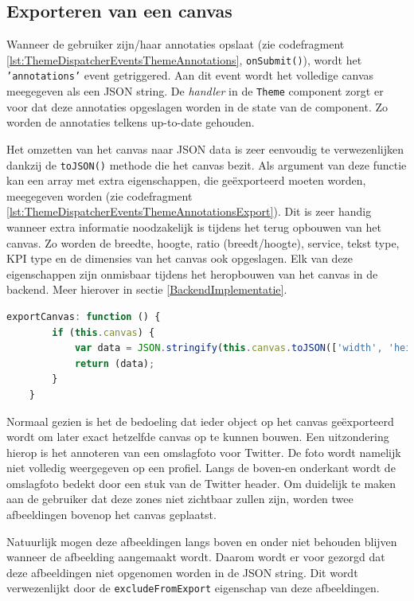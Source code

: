 \subsection{Exporteren van een canvas}
Wanneer de gebruiker zijn/haar annotaties opslaat (zie codefragment \ref{lst:ThemeDispatcherEventsThemeAnnotations}, \texttt{onSubmit()}), wordt het \texttt{'annotations'} event getriggered. Aan dit event wordt het volledige canvas meegegeven als een JSON string. De \textit{handler} in de \texttt{Theme} component zorgt er voor dat deze annotaties opgeslagen worden in de state van de component. Zo worden de annotaties telkens up-to-date gehouden. 

Het omzetten van het canvas naar JSON data is zeer eenvoudig te verwezenlijken dankzij de \texttt{toJSON()} methode die het canvas bezit. Als argument van deze functie kan een array met extra eigenschappen, die ge\"{e}xporteerd moeten worden, meegegeven worden (zie codefragment \ref{lst:ThemeDispatcherEventsThemeAnnotationsExport}). Dit is zeer handig wanneer extra informatie noodzakelijk is tijdens het terug opbouwen van het canvas. Zo worden de breedte, hoogte, ratio (breedt/hoogte), service, tekst type, KPI type en de dimensies van het canvas ook opgeslagen. Elk van deze eigenschappen zijn onmisbaar tijdens het heropbouwen van het canvas in de backend. Meer hierover in sectie \ref{BackendImplementatie}. 

\begin{lstlisting}[caption={ThemeAnnotations component - exporteren van het canvas},label=lst:ThemeDispatcherEventsThemeAnnotationsExport,language=javascript]
	exportCanvas: function () {
		if (this.canvas) {
			var data = JSON.stringify(this.canvas.toJSON(['width', 'height', 'multiply', 'service', 'textType', 'kpiType', 'dimensions']));
			return (data);
		}
	}
\end{lstlisting}

Normaal gezien is het de bedoeling dat ieder object op het canvas ge\"{e}xporteerd wordt om later exact hetzelfde canvas op te kunnen bouwen. Een uitzondering hierop is het annoteren van een omslagfoto voor Twitter. De foto wordt namelijk niet volledig weergegeven op een profiel. Langs de boven-en onderkant wordt de omslagfoto bedekt door een stuk van de Twitter header. Om duidelijk te maken aan de gebruiker dat deze zones niet zichtbaar zullen zijn, worden twee afbeeldingen bovenop het canvas geplaatst. 


Natuurlijk mogen deze afbeeldingen langs boven en onder niet behouden blijven wanneer de afbeelding aangemaakt wordt. Daarom wordt er voor gezorgd dat deze afbeeldingen niet opgenomen worden in de JSON string. Dit wordt verwezenlijkt door de \texttt{excludeFromExport} eigenschap van deze afbeeldingen.

